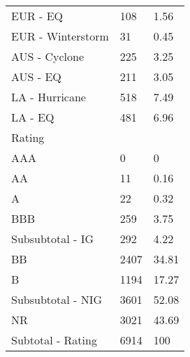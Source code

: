 \begin{tabular}{lll}
  EUR - EQ                &   108 &       1.56 \\
  EUR - Winterstorm       &    31 &       0.45 \\
  AUS - Cyclone           &   225 &       3.25 \\
  AUS - EQ                &   211 &       3.05 \\
  LA - Hurricane          &   518 &       7.49 \\
  LA - EQ                 &   481 &       6.96 \\
Rating                    &       &            \\
  AAA                     &     0 &          0 \\
  AA                      &    11 &       0.16 \\
  A                       &    22 &       0.32 \\
  BBB                     &   259 &       3.75 \\
  Subsubtotal - IG        &   292 &       4.22 \\
  BB                      &  2407 &      34.81 \\
  B                       &  1194 &      17.27 \\
  Subsubtotal - NIG       &  3601 &      52.08 \\
  NR                      &  3021 &      43.69 \\
  Subtotal - Rating       &  6914 &        100 \\
\bottomrule
\end{tabular}
